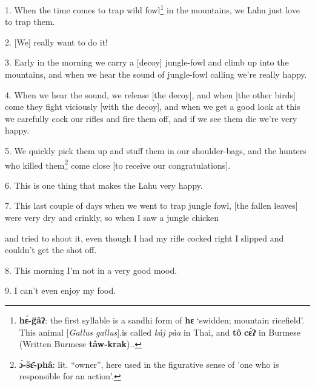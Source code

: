 \setcounter{footnote}{0}

1. When the time comes to trap wild fowl\footnote{\textbf{hɛ́-g̈âʔ}: the first syllable is a sandhi form of \textbf{hɛ} `swidden; mountain ricefield'. This animal [\textit{Gallus gallus}].is called \textit{kàj pàa} in Thai, and \textbf{tô} \textbf{cɛ́ʔ} in Burmese (Written Burmese \textbf{tâw-krak})..} in the mountains, we Lahu just love
to trap them.

2. [We] really want to do it!

3. Early in the morning we carry a [decoy] jungle-fowl and climb up into the mountains,
and when we hear the sound of jungle-fowl calling we're really happy.

4. When we hear the sound, we release [the decoy], and when [the other birds] come
they fight viciously [with the decoy], and when we get a good look at this we carefully
cock our rifles and fire them off, and if we see them die we're very happy.

5. We quickly pick them up and stuff them in our shoulder-bags, and the hunters
who killed them\footnote{\textbf{ɔ̀-šɛ̄-phâ}: lit. ``owner'', here used in the figurative sense of 'one who is responsible for an action'.} come close [to receive our congratulations].

6. This is one thing that makes the Lahu very happy.

7. This last couple of days when we went to trap jungle fowl, [the fallen leaves]
were very dry and crinkly, so when I saw a jungle chicken

and tried to shoot it, even though I had my rifle cocked right I slipped and couldn't
get the shot off.

8. This morning I'm not in a very good mood.

9. I can't even enjoy my food.

